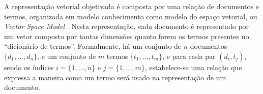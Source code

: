 \documentclass[
    12pt,                %
    oneside,            %
    a4paper,            %
    english,            %
    brazil                %
    ]{abntex2ppgsi}
\begin{document}



A representação vetorial objetivada é composta por uma relação de documentos e termos, organizada em modelo conhecimento como modelo do espaço vetorial, ou \textit{Vector Space Model} \cite{Salton1975,Sebastiani2002,Lops2011}.
Nesta representação, cada documento é representado por um vetor composto por tantas dimensões quanto forem os termos presentes no ``dicionário de termos''.
Formalmente, há um conjunto de $n$ documentos $\{ d_1, \dots, d_n \}$, e um conjunto de $m$ termos $\{ t_1, \dots, t_m \}$, e para cada par $(d_i, t_j)$, sendo os índices $i = \{1, \dots, n\}$ e $j = \{1, \dots, m\}$, estabelece-se uma relação que expressa a maneira como um termo será usado na representação de um documento.
\end{document}
